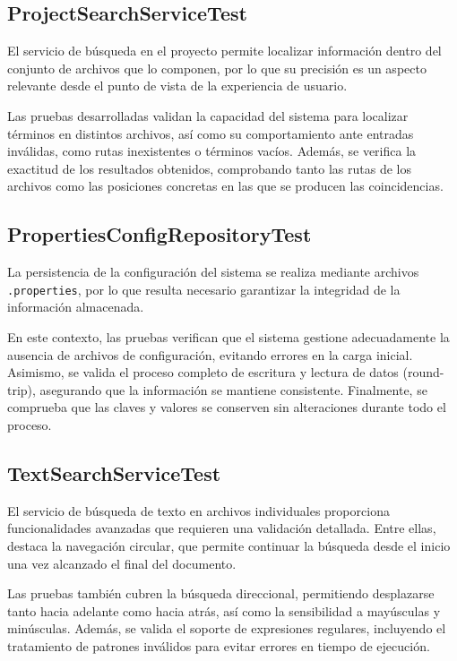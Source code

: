 \documentclass[../../main.tex]{subfiles}
\begin{document}
\subsection{ProjectSearchServiceTest}

El servicio de búsqueda en el proyecto permite localizar información dentro del conjunto de archivos que lo componen, por lo que su precisión es un aspecto relevante desde el punto de vista de la experiencia de usuario.

Las pruebas desarrolladas validan la capacidad del sistema para localizar términos en distintos archivos, así como su comportamiento ante entradas inválidas, como rutas inexistentes o términos vacíos. Además, se verifica la exactitud de los resultados obtenidos, comprobando tanto las rutas de los archivos como las posiciones concretas en las que se producen las coincidencias.

\subsection{PropertiesConfigRepositoryTest}

La persistencia de la configuración del sistema se realiza mediante archivos \lstinline|.properties|, por lo que resulta necesario garantizar la integridad de la información almacenada.

En este contexto, las pruebas verifican que el sistema gestione adecuadamente la ausencia de archivos de configuración, evitando errores en la carga inicial. Asimismo, se valida el proceso completo de escritura y lectura de datos (round-trip), asegurando que la información se mantiene consistente. Finalmente, se comprueba que las claves y valores se conserven sin alteraciones durante todo el proceso.

\clearpage

\subsection{TextSearchServiceTest}

El servicio de búsqueda de texto en archivos individuales proporciona funcionalidades avanzadas que requieren una validación detallada. Entre ellas, destaca la navegación circular, que permite continuar la búsqueda desde el inicio una vez alcanzado el final del documento.

Las pruebas también cubren la búsqueda direccional, permitiendo desplazarse tanto hacia adelante como hacia atrás, así como la sensibilidad a mayúsculas y minúsculas. Además, se valida el soporte de expresiones regulares, incluyendo el tratamiento de patrones inválidos para evitar errores en tiempo de ejecución.
\end{document}
